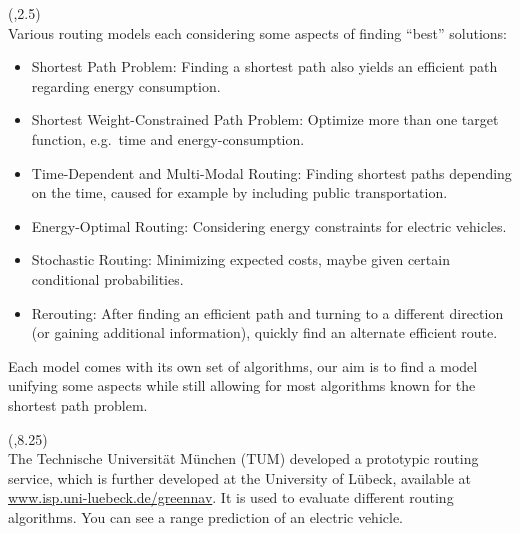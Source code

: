 \begin{textblock}{\mycolwidth}(\leftpos,2.5)
 \\
\large
Various routing models each considering some aspects of finding ``best''
solutions:
\begin{itemize}
  \item Shortest Path Problem: Finding a shortest path also yields an efficient path regarding energy consumption.
  \item Shortest Weight-Constrained Path Problem: Optimize more than one target function, e.g.\ time and energy-consumption.
  \item Time-Dependent and Multi-Modal Routing: Finding shortest paths depending on the time, caused for example by including public transportation.
  \item Energy-Optimal Routing: Considering energy constraints for electric vehicles.
  \item Stochastic Routing: Minimizing expected costs, maybe given certain conditional probabilities.
  \item Rerouting: After finding an efficient path and turning to a different direction (or gaining additional information),
  quickly find an alternate efficient route.
\end{itemize}
Each model comes with its own set of algorithms,
our aim is to find a model unifying some aspects while still
allowing for most algorithms known for the shortest path problem.
\end{textblock}

\begin{textblock}{\mycolwidth}(\leftpos,8.25)
 \\
The Technische Universit\"at M\"unchen (TUM) developed a prototypic routing service,
which is further developed at the University of L\"ubeck,
available at \url{www.isp.uni-luebeck.de/greennav}. It is used
to evaluate different routing algorithms. You can see a range prediction
of an electric vehicle.\\[1em]
\end{textblock}

